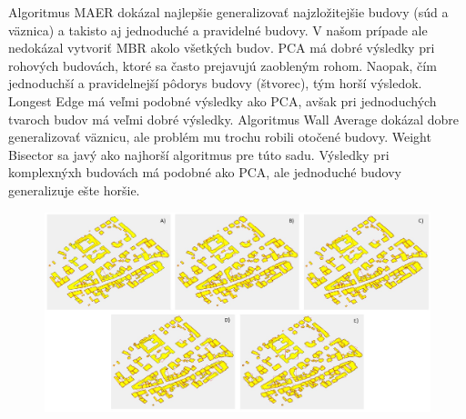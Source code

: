 \documentclass[12pt]{article}
\begin{document}
\par
Algoritmus MAER dokázal najlepšie generalizovať najzložitejšie budovy (súd a väznica) a takisto aj jednoduché a pravidelné budovy. V našom prípade ale nedokázal vytvoriť MBR akolo všetkých budov. PCA má dobré výsledky pri rohových budovách, ktoré sa často prejavujú zaobleným rohom. Naopak, čím jednoduchší a pravidelnejší pôdorys budovy (štvorec), tým horší výsledok. Longest Edge má veľmi podobné výsledky ako PCA, avšak pri jednoduchých tvaroch budov má veľmi dobré výsledky. Algoritmus Wall Average dokázal dobre generalizovať väznicu, ale problém mu trochu robili otočené budovy. Weight Bisector sa javý ako najhorší algoritmus pre túto sadu. Výsledky pri komplexnýxh budovách má podobné ako PCA, ale jednoduché budovy generalizuje ešte horšie.
\begin{figure}[h]
    \centering
    \includegraphics[width=1\linewidth]{latex/image/horna.jpg}
    \label{fig:enter-label}
\end{figure}
$$$$ 
\end{document}
